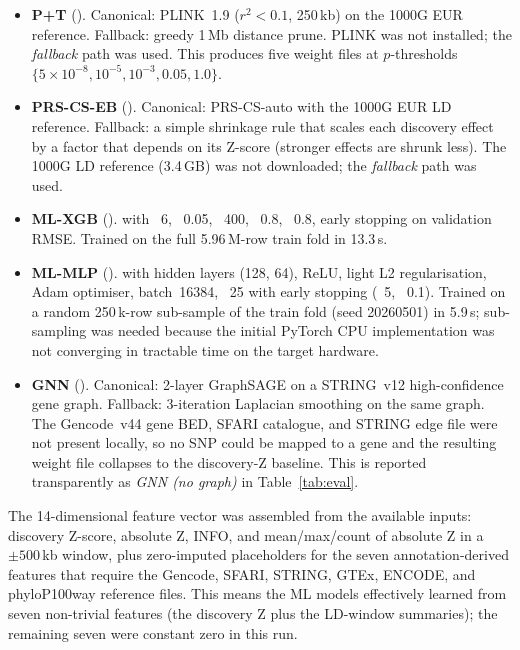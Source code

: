 \begin{itemize}[leftmargin=1.4em]
  \item \textbf{P+T} (). Canonical:
        PLINK~1.9  ($r^2<0.1$, 250\,kb) on the 1000G
        EUR reference. Fallback: greedy 1\,Mb distance prune. PLINK was
        not installed; the \emph{fallback} path was used. This produces
        five weight files at $p$-thresholds
        $\{5\!\times\!10^{-8}, 10^{-5}, 10^{-3}, 0.05, 1.0\}$.
  \item \textbf{PRS-CS-EB} ().
        Canonical: PRS-CS-auto with the 1000G EUR LD reference.
        Fallback: a simple shrinkage rule that scales each discovery
        effect by a factor that depends on its Z-score (stronger
        effects are shrunk less). The 1000G LD reference (3.4\,GB) was
        not downloaded; the \emph{fallback} path was used.
  \item \textbf{ML-XGB} ().
         with ~6,
        ~0.05, ~400,
        ~0.8, ~0.8, early
        stopping on validation RMSE. Trained on the full
        5.96\,M-row train fold in 13.3\,s.
  \item \textbf{ML-MLP} ().
         with
        hidden layers (128, 64), ReLU, light L2 regularisation, Adam
        optimiser, batch~16384, ~25 with
        early stopping (~5,
        ~0.1). Trained on a random
        250\,k-row sub-sample of the train fold (seed 20260501) in
        5.9\,s; sub-sampling was needed because the initial PyTorch
        CPU implementation was not converging in tractable time on the
        target hardware.
  \item \textbf{GNN} ().
        Canonical: 2-layer GraphSAGE on a STRING~v12 high-confidence
        gene graph. Fallback: 3-iteration Laplacian smoothing on the
        same graph. The Gencode~v44 gene BED, SFARI catalogue, and
        STRING edge file were not present locally, so no SNP could be
        mapped to a gene and the resulting weight file collapses to
        the discovery-Z baseline. This is reported transparently as
        \emph{GNN (no graph)} in Table~\ref{tab:eval}.
\end{itemize}

The 14-dimensional feature vector was assembled from the available
inputs: discovery Z-score, absolute Z, INFO, and mean/max/count of
absolute Z in a $\pm 500$\,kb window, plus
zero-imputed placeholders for the seven annotation-derived features
that require the Gencode, SFARI, STRING, GTEx, ENCODE, and
phyloP100way reference files. This means the
ML models effectively learned from seven non-trivial features (the
discovery Z plus the LD-window summaries); the remaining seven were
constant zero in this run.


